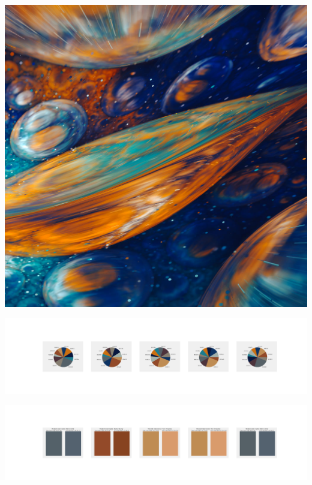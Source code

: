 \documentclass[11pt]{article}
\begin{document}
\begin{landscape}
    \begin{center}
    \includegraphics[width=\textwidth]{./nbimg/file (435).jpg}
    \end{center}

    \begin{center}
    \includegraphics[width=250mm]{./nbimg/pie-373.jpg}
    \end{center}

    \begin{center}
    \includegraphics[width=250mm]{./nbimg/peak-373.jpg}
    \end{center}
    


\end{landscape}
\end{document}
